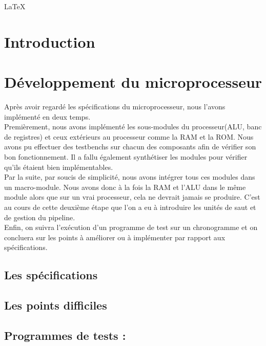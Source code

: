 \documentclass[a4paper]{report}
\begin{document}
\begin{titlepage}
\begin{center}
\LaTeX
\end{center}

\end{titlepage}


\tableofcontents

\newpage

\chapter*{Introduction} 

\newpage


\chapter{Développement du microprocesseur}

Après avoir regardé les spécifications du microprocesseur, nous l'avons implémenté en deux temps.\\
Premièrement, nous avons implémenté les sous-modules du processeur(ALU, banc de registres) et ceux extérieurs au processeur comme la RAM et la ROM. Nous avons pu effectuer des testbenchs sur chacun des composants afin de vérifier son bon fonctionnement. Il a fallu  également synthétiser les modules pour vérifier qu'ils étaient bien implémentables.\\
Par la suite, par soucis de simplicité, nous avons intégrer tous ces modules dans un macro-module. Nous avons donc à la fois la RAM et l'ALU dans le même module alors que sur un vrai processeur, cela ne devrait jamais se produire. C'est au cours de cette deuxième étape que l'on a eu à introduire les unités de saut et de gestion du pipeline.\\
Enfin, on suivra l'exécution d'un programme de test sur un chronogramme et on concluera sur les points à améliorer ou à implémenter par rapport aux spécifications.

\newpage

\section{Les spécifications}


\section{Les points difficiles}


\section{Programmes de tests :}

\end{document}
